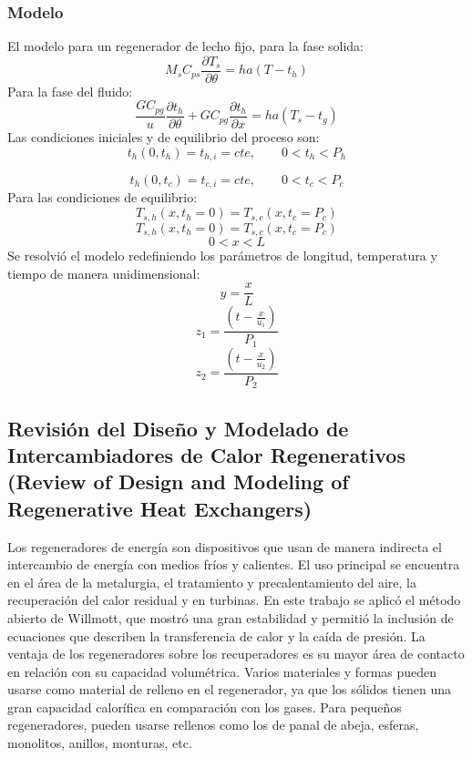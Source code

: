 \documentclass[12pt,letterpaper,final]{article}%
\begin{document}
\subsubsection*{Modelo}
El modelo para un regenerador de lecho fijo, para la fase solida:
\begin{equation}
	M_s C_{ps}\frac{\partial T_s}{\partial \theta} = h a (T - t_h)
\end{equation}
Para la fase del fluido:
\begin{equation}
	\frac{G C_{pg}}{u}\frac{\partial t_h}{\partial \theta} + G C_{pg}\frac{\partial t_h}{\partial x} = ha(T_s - t_g)
\end{equation}
Las condiciones iniciales y de equilibrio del proceso son:
\begin{equation*}
	t_h(0,t_h) = t_{h,i} = cte , \qquad 0<t_h<P_h
\end{equation*}

\begin{equation*}
	t_h(0,t_c) = t_{c,i} = cte , \qquad 0<t_c<P_c
\end{equation*}
Para las condiciones de equilibrio:
\begin{equation*}
	T_{s,h}(x,t_h=0) = T_{s,c}(x,t_c=P_c)
\end{equation*}
\begin{equation*}
	T_{s,h}(x,t_h=0) = T_{s,c}(x,t_c=P_c)
\end{equation*}
\begin{equation*}
	0<x<L
\end{equation*}
Se resolvió el modelo redefiniendo los parámetros de longitud, temperatura y tiempo de manera unidimensional:
\begin{equation*}
	y = \frac{x}{L}
\end{equation*}
\begin{equation*}
	z_1 = \frac{(t-\frac{x}{u_1})}{P_1}
\end{equation*}
\begin{equation*}
	z_2 = \frac{(t-\frac{x}{u_2})}{P_2}
\end{equation*}
\subsection*{Revisión del Diseño y Modelado de Intercambiadores de Calor Regenerativos (Review of Design and Modeling of Regenerative
	Heat Exchangers)}
Los regeneradores de energía son dispositivos que usan de manera indirecta el intercambio de energía con medios fríos y calientes. El uso principal se encuentra en el área de la metalurgia, el tratamiento y precalentamiento del aire, la recuperación del calor residual y en turbinas. En este trabajo se aplicó el método abierto de Willmott, que mostró una gran estabilidad y permitió la inclusión de ecuaciones que describen la transferencia de calor y la caída de presión. La ventaja de los regeneradores sobre los recuperadores es su mayor área de contacto en relación con su capacidad volumétrica. Varios materiales y formas pueden usarse como material de relleno en el regenerador, ya que los sólidos tienen una gran capacidad calorífica en comparación con los gases. Para pequeños regeneradores, pueden usarse rellenos como los de panal de abeja, esferas, monolitos, anillos, monturas, etc.  \cite{Kilkovsky2020}
\end{document}
